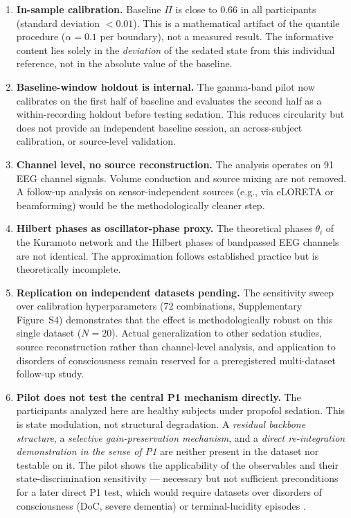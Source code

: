 ﻿\documentclass[11pt,a4paper]{article}
\theoremstyle{plain}
\theoremstyle{definition}
\theoremstyle{remark}
\begin{document}
\begin{enumerate}
\item \textbf{In-sample calibration.} Baseline $\Pi$ is close to $0.66$ in all participants (standard deviation $< 0.01$). This is a mathematical artifact of the quantile procedure ($\alpha = 0.1$ per boundary), not a measured result. The informative content lies solely in the \emph{deviation} of the sedated state from this individual reference, not in the absolute value of the baseline.

\item \textbf{Baseline-window holdout is internal.} The gamma-band pilot now calibrates on the first half of baseline and evaluates the second half as a within-recording holdout before testing sedation. This reduces circularity but does not provide an independent baseline session, an across-subject calibration, or source-level validation.

\item \textbf{Channel level, no source reconstruction.} The analysis operates on 91 EEG channel signals. Volume conduction and source mixing are not removed. A follow-up analysis on sensor-independent sources (e.g., via eLORETA or beamforming) would be the methodologically cleaner step.

\item \textbf{Hilbert phases as oscillator-phase proxy.} The theoretical phases $\theta_i$ of the Kuramoto network and the Hilbert phases of bandpassed EEG channels are not identical. The approximation follows established practice but is theoretically incomplete.

\item \textbf{Replication on independent datasets pending.} The sensitivity sweep over calibration hyperparameters (72 combinations, Supplementary Figure~S4) demonstrates that the effect is methodologically robust on this single dataset ($N = 20$). Actual generalization to other sedation studies, source reconstruction rather than channel-level analysis, and application to disorders of consciousness remain reserved for a preregistered multi-dataset follow-up study.

\item \textbf{Pilot does not test the central P1 mechanism directly.} The participants analyzed here are healthy subjects under propofol sedation. This is state modulation, not structural degradation. A \emph{residual backbone structure}, a \emph{selective gain-preservation mechanism}, and a \emph{direct re-integration demonstration in the sense of P1} are neither present in the dataset nor testable on it. The pilot shows the applicability of the observables and their state-discrimination sensitivity --- necessary but not sufficient preconditions for a later direct P1 test, which would require datasets over disorders of consciousness (DoC, severe dementia) or terminal-lucidity episodes \citep{giacino2018,mashour2019}.


\end{enumerate}
\end{document}
